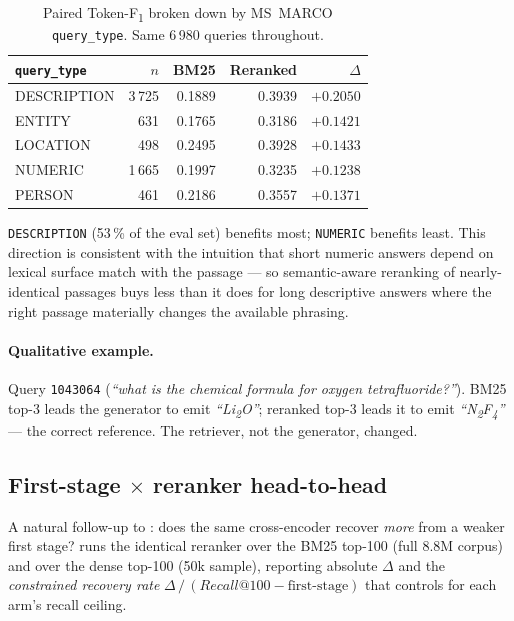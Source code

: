 \documentclass[11pt,a4paper]{article}
\makeatletter
\newcommand{\fdev}{6\,980}
\newcommand{\msmarco}{MS~MARCO}
\newcommand{\F}{F\textsubscript{1}}
\newcommand{\Tokenf}{Token-\F}
\newcommand{\recallH}{Recall@100}
\newcommand{\bmtwofive}{BM25}
\makeatother
\begin{document}
\begin{table}[H]
  \centering
  \caption{Paired \Tokenf{} broken down by \msmarco{}
  \texttt{query\_type}.  Same \fdev{} queries throughout.}
  \label{tab:bucket-by-type}
  \begin{tabular}{lrrrr}
    \toprule
    \texttt{query\_type} & $n$ & \bmtwofive{} & Reranked & $\Delta$ \\
    \midrule
    DESCRIPTION & 3\,725 & 0.1889 & 0.3939 & $\mathbf{+0.2050}$ \\
    ENTITY      &   631  & 0.1765 & 0.3186 & $+0.1421$ \\
    LOCATION    &   498  & 0.2495 & 0.3928 & $+0.1433$ \\
    NUMERIC     & 1\,665 & 0.1997 & 0.3235 & $+0.1238$ \\
    PERSON      &   461  & 0.2186 & 0.3557 & $+0.1371$ \\
    \bottomrule
  \end{tabular}
\end{table}

\texttt{DESCRIPTION} (53\,\% of the eval set) benefits most;
\texttt{NUMERIC} benefits least.  This direction is consistent with
the intuition that short numeric answers depend on lexical surface
match with the passage --- so semantic-aware reranking of nearly-
identical passages buys less than it does for long descriptive
answers where the right passage materially changes the available
phrasing.

\paragraph{Qualitative example.}  Query \texttt{1043064}
(\emph{``what is the chemical formula for oxygen tetrafluoride?''}).
\bmtwofive{} top-3 leads the generator to emit \emph{``Li\textsubscript{2}O''};
reranked top-3 leads it to emit \emph{``N\textsubscript{2}F\textsubscript{4}''}
--- the correct reference.  The retriever, not the generator,
changed.

\subsection{First-stage $\times$ reranker head-to-head}
\label{sec:w5a}

A natural follow-up to : does the same
cross-encoder recover \emph{more} from a weaker first stage?
 runs the identical reranker over the
\bmtwofive{} top-100 (full 8.8M corpus) and over the dense
top-100 (50k sample), reporting absolute $\Delta$ and the
\emph{constrained recovery rate} $\Delta\,/\,(\recallH{} - \text{first-stage})$
that controls for each arm's recall ceiling.
\end{document}
